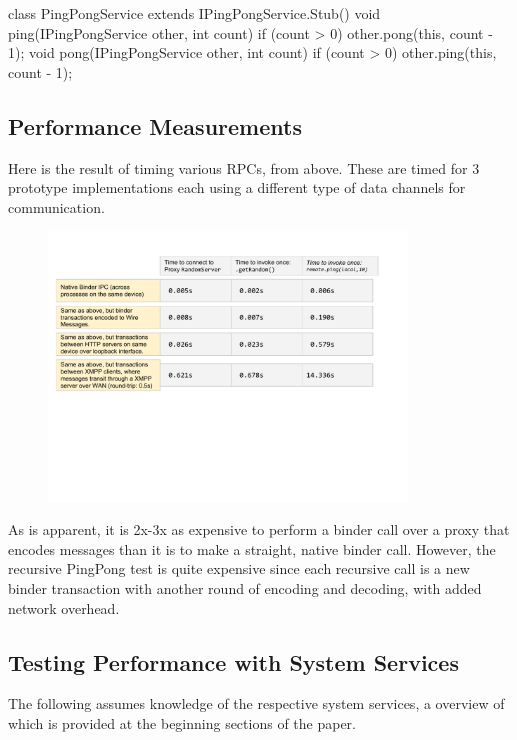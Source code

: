 \documentclass[prodmode]{acmlarge}
\begin{document}
\begin{snippet}
class PingPongService extends
    IPingPongService.Stub() {
  void ping(IPingPongService other, int count) {
    if (count > 0) other.pong(this, count - 1);
  }
  void pong(IPingPongService other, int count) {
    if (count > 0) other.ping(this, count - 1);
  }
}
\end{snippet}

\subsection{Performance Measurements}
Here is the result of timing various RPCs, from above. These are timed for 3 prototype implementations each using a different type of data channels for communication.

\begin{figure}[h]
\centering
\includegraphics[width=0.85\textwidth]{drawings/Performance.pdf}
\end{figure}

As is apparent, it is 2x-3x as expensive to perform a binder call over a proxy that encodes messages than it is to make a straight, native binder call. However, the recursive PingPong test is quite expensive since each recursive call is a new binder transaction with another round of encoding and decoding, with added network overhead.

\subsection{Testing Performance with System Services}

The following assumes knowledge of the respective system services, a overview of which is provided at the beginning sections of the paper.
\end{document}
